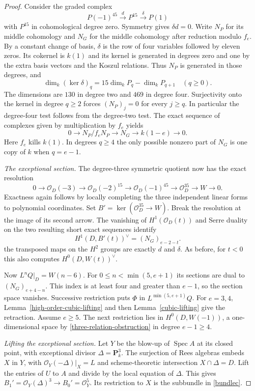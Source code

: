 \begin{proof}
Consider the graded complex
\[
 P(-1)^{45}\xrightarrow{d}P^{15}\xrightarrow{\delta}P(1)
\]
with $P^{15}$ in cohomological degree zero. Symmetry gives $\delta d=0$. Write $N_P$ for its middle cohomology and $N_G$ for the middle cohomology after reduction modulo $f_e$. By a constant change of basis, $\delta$ is the row of four variables followed by eleven zeros. Its cokernel is $k(1)$ and its kernel is generated in degrees zero and one by the extra basis vectors and the Koszul relations. Thus $N_P$ is generated in those degrees, and
\[
 \dim_k(\ker\delta)_q=15\dim_k P_q-\dim_k P_{q+1}\quad(q\ge0).
\]
The dimensions are $130$ in degree two and $469$ in degree four. Surjectivity onto the kernel in degree $q\ge2$ forces $(N_P)_j=0$ for every $j\ge q$. In particular the degree-four test follows from the degree-two test. The exact sequence of complexes given by multiplication by $f_e$ yields
\begin{equation}\label{three-relation-obstruction}
 0\longrightarrow N_P/f_eN_P\longrightarrow N_G\longrightarrow k(1-e)\longrightarrow0 .
\end{equation}
Here $f_e$ kills $k(1)$. In degrees $q\ge4$ the only possible nonzero part of $N_G$ is one copy of $k$ when $q=e-1$.

\emph{The exceptional section.}
The degree-three symmetric quotient now has the exact resolution
\[
 0\to\mathcal O_D(-3)\to\mathcal O_D(-2)^{15}\to
 \mathcal O_D(-1)^{45}\to\mathcal O_D^{35}\to W\to0.
\]
Exactness again follows by locally completing the three independent
linear forms to polynomial coordinates.
Set $B'=\ker(\mathcal O_D^{35}\to W)$.
Break the resolution at the image of its second arrow.
The vanishing of $H^1(\mathcal O_D(t))$ and Serre duality on the two
resulting short exact sequences identify
\[
 H^1(D,B'(t))^\vee=(N_G)_{e-2-t}.
\]
the transposed maps on the $H^2$ groups are exactly $d$ and $\delta$.
As before, for $t<0$ this also computes $H^0(D,W(t))^\vee$.

Now $L^nQ|_D=W(n-6)$. For $0\le n<\min(5,e+1)$ its sections are dual to $(N_G)_{e+4-n}$. This index is at least four and greater than $e-1$, so the section space vanishes. Successive restriction puts $\Phi$ in $L^{\min(5,e+1)}Q$. For $e=3,4$, Lemma~\ref{high-order-cubic-lifting} and then Lemma~\ref{cubic-lifting} give the retraction. Assume $e\ge5$. The next restriction lies in $H^0(D,W(-1))$, a one-dimensional space by \eqref{three-relation-obstruction} in degree $e-1\ge4$.

\emph{Lifting the exceptional section.}
Let $Y$ be the blow-up of $\operatorname{Spec}A$ at its closed point,
with exceptional divisor $\Delta=\mathbf P^3_k$.
The surjection of Rees algebras embeds $X$ in $Y$, with
$\mathcal O_Y(-\Delta)|_X=L$ and scheme-theoretic intersection
$X\cap\Delta=D$.
Lift the entries of $U$ to $A$ and divide by the local equation of
$\Delta$.  This gives
$B_1'=\mathcal O_Y(\Delta)^3\to B_0'=\mathcal O_Y^5$.
Its restriction to $X$ is the subbundle in \eqref{bundlec}.


\end{proof}
